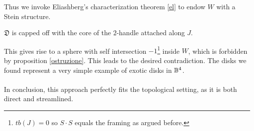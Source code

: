 Thus we invoke Eliashberg's characterization theorem \ref{el} to endow $W$ with a Stein structure.
\begin{obs}$\mathfrak{D}$ is capped off with the core of the $2$-handle attached along $J$. 
\end{obs}
This gives rise to a sphere with self intersection $-1$\footnote{$tb(J) = 0$ so $S \cdot S$ equals the framing as argued before.} inside $W$, which is forbidden by proposition \ref{ostruzione}. This leads to the desired contradiction. The disks we found represent a very simple example of exotic disks in $\mathbb{B}^4$. \\ \\
In conclusion, this approach perfectly fits the topological setting, as it is both direct and streamlined. 
